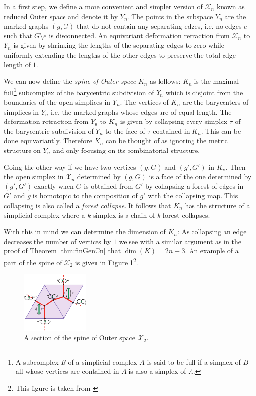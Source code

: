 In a first step, we define a more convenient and simpler version of $\mathcal{X}_{n}$ known as reduced Outer space and denote it by $Y_{n}$.
The points in the subspace $Y_{n}$ are the marked graphs $(g,G)$ that do not contain any separating edges, i.e.
no edges $e$ such that $G \setminus e$ is disconnected.
An equivariant deformation retraction from $\mathcal{X}_{n}$ to $Y_{n}$ is given by shrinking the lengths of
the separating edges to zero while uniformly extending the lengths of the other edges to preserve the total edge length of $1$.

We can now define the \emph{spine of Outer space} $K_{n}$ as follows:
$K_{n}$ is the maximal full\footnote{A subcomplex $B$ of a simplicial complex $A$ is said to be full if a simplex of $B$ all whose vertices are contained in $A$ is also a simplex of $A$.}
subcomplex of the barycentric subdivision of $Y_{n}$ which is disjoint from the boundaries of the open simplices in $Y_{n}$.
The vertices of $K_{n}$ are the barycenters of simplices in $Y_{n}$ i.e. the marked graphs whose edges are of equal length.
The deformation retraction from $Y_{n}$ to $K_{n}$ is given by
collapsing every simplex $\tau$ of the barycentric subdivision of $Y_{n}$ to the face of $\tau$ contained in $K_{n}$.
This can be done equivariantly.
Therefore $K_{n}$ can be thought of as ignoring the metric structure on $Y_{n}$ and only focusing on its combinatorial structure.

Going the other way if we have two vertices $(g,G)$ and $(g',G')$ in $K_{n}$. Then the open simplex in $\mathcal{X}_{n}$ 
determined by $(g,G)$ is a face of  the one determined by $(g',G')$ exactly when $G$ is obtained from $G'$ 
by collapsing a forest of edges in $G'$ and  $g$ is homotopic to the composition of $g'$ with the collapsing map.
This collapsing is also called a \emph{forest collapse}.
It follows that $K_{n}$ has the structure of a simplicial complex where a $k$-simplex is a chain of $k$ forest collapses. 

With this in mind we can determine the dimension of $K_{n}$: As collapsing an edge decreases the number of vertices by $1$
we see with a similar argument as in the proof of Theorem \ref{thm:finGenCn} that $\dim(K) = 2n -3$.
An example of a part of the spine of $\mathcal{X}_{2}$ is given in Figure \ref{fig:SpineOfXn}\footnote{This figure is taken from \cite{vogtmann02}}. 

\begin{figure}[h]
	\centering
	\includegraphics[width=0.3\textwidth]{./Images/spineOfOuterSpace.pdf}
	\caption{A section of the spine of Outer space $\mathcal{X}_{2}$.}
	\label{fig:SpineOfXn}
\end{figure}

